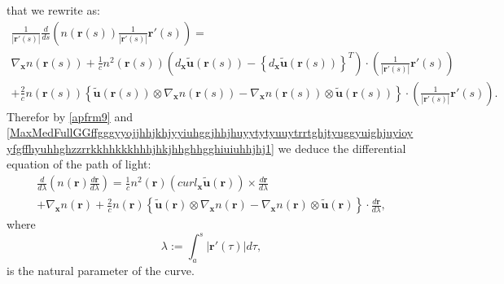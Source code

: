 \documentclass{article}
\theoremstyle{definition}
\theoremstyle{remark}
\renewcommand{\vec}[1]{\mathbf{#1}}
\newcommand{\er}{\eqref}
\newcommand{\er}{\eqref}
\begin{document}
that we rewrite as:
\begin{multline}\label{MaxMedFullGGffgggyyojjhhjkhjyyiuhggjhhjhuyytytyuuytrrtghjtyuggyuighjuyioyyfgffhyuhhghzzrrkkhhkkkhhhjhkjhhghhgghiuiuhhjhj1}
\frac{1}{\left|\vec r'(s)\right|}\frac{d}{ds}\left(n\left(\vec
r(s)\right)\frac{1}{\left|\vec r'(s)\right|}\vec r'(s)\right)=\\
\nabla_{\vec x}n\left(\vec r(s)\right)+\frac{1}{c}n^2\left(\vec
r(s)\right)\left(d_{\vec x}\vec {\tilde u}\left(\vec
r(s)\right)-\left\{d_{\vec x}\vec {\tilde u}\left(\vec
r(s)\right)\right\}^T\right)\cdot\left(\frac{1}{\left|\vec
r'(s)\right|}\vec r'(s)\right)\\
+\frac{2}{c}n\left(\vec r(s)\right)\left\{\vec {\tilde u}\left(\vec
r(s)\right)\otimes\nabla_{\vec x}n\left(\vec
r(s)\right)-\nabla_{\vec x}n\left(\vec r(s)\right)\otimes\vec
{\tilde u}\left(\vec
r(s)\right)\right\}\cdot\left(\frac{1}{\left|\vec r'(s)\right|}\vec
r'(s)\right).
\end{multline}
Therefor by \er{apfrm9} and
\er{MaxMedFullGGffgggyyojjhhjkhjyyiuhggjhhjhuyytytyuuytrrtghjtyuggyuighjuyioyyfgffhyuhhghzzrrkkhhkkkhhhjhkjhhghhgghiuiuhhjhj1}
we deduce the differential equation of the path of light:
\begin{multline}\label{MaxMedFullGGffgggyyojjhhjkhjyyiuhggjhhjhuyytytyuuytrrtghjtyuggyuighjuyioyyfgffhyuhhghzzrrkkhhkkkhhhjhkjhhghhgghiuiuhhjhj}
\frac{d}{d\lambda}\left(n\left(\vec r\right)\frac{d\vec
r}{d\lambda}\right)=\frac{1}{c}n^2\left(\vec
r\right)\left(curl_{\vec x}\vec {\tilde u}\left(\vec
r\right)\right)\times\frac{d\vec r}{d\lambda}\\ +\nabla_{\vec
x}n\left(\vec r\right) +\frac{2}{c}n\left(\vec r\right)\left\{\vec
{\tilde u}\left(\vec r\right)\otimes\nabla_{\vec x}n\left(\vec
r\right)-\nabla_{\vec x}n\left(\vec r\right)\otimes\vec {\tilde
u}\left(\vec r\right)\right\}\cdot\frac{d\vec r}{d\lambda},
\end{multline}
where
\begin{equation}\label{MaxMedFullGGffgggyyojjhhjkhjyyiuhggjhhjhuyytytyuuytrrtghjtyuggyuighjuyioyyfgffhyuhhghzzrrkkhhkkkhhhjhkjhhghhgghiuiu}
\lambda:=\int_a^s\left|\vec r'(\tau)\right|d\tau,
\end{equation}
is the natural parameter of the curve.
\end{document}
